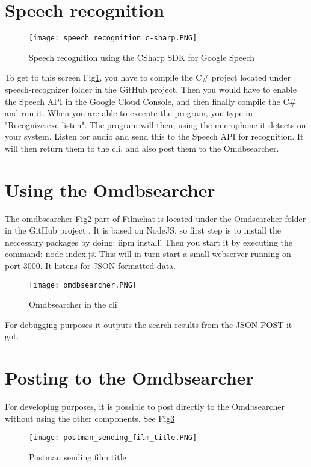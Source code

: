 \documentclass[11pt,fleqn]{book} %
\begin{document}
\section{Speech recognition}
\begin{figure}[]
  \centering
   \texttt{[image: speech\_recognition\_c-sharp.PNG]}
  \caption{Speech recognition using the CSharp SDK for Google Speech}
  \label{fig:c-sharp-speech}
\end{figure}
To get to this screen Fig\ref{fig:c-sharp-speech}, you have to compile the C\# project located under speech-recognizer folder in the GitHub project. \cite{Github2017GitHubProject}
Then you would have to enable the Speech API in the Google Cloud Console, and then finally compile the C\# and run it.
When you are able to execute the program, you type in "Recognize.exe listen". The program will then, using the microphone it detects on your system. Listen for audio and send this to the Speech API for recognition. It will then return them to the cli, and also post them to the Omdbsearcher.

\newpage
\section{Using the Omdbsearcher}
The omdbsearcher Fig\ref{fig:omdbsearcher} part of Filmchat is located under the Omdsearcher folder in the GitHub project \cite{Github2017GitHubProject}. It is based on NodeJS, so first step is to install the neccessary packages by doing: \"npm install\". Then you start it by executing the command: \"node index.js\". This will in turn start a small webserver running on port 3000.
It listens for JSON-formatted data.
\begin{figure}[]
  \centering
   \texttt{[image: omdbsearcher.PNG]}
  \caption{Omdbsearcher in the cli}
  \label{fig:omdbsearcher}
\end{figure}
For debugging purposes it outputs the search results from the JSON POST it got.

\newpage
\section{Posting to the Omdbsearcher}
For developing purposes, it is possible to post directly to the Omdbsearcher without using the other components. See Fig\ref{fig:postman-film}

\begin{figure}[]
  \centering
   \texttt{[image: postman\_sending\_film\_title.PNG]}
  \caption{Postman sending film title}
  \label{fig:postman-film}
\end{figure}
\end{document}
